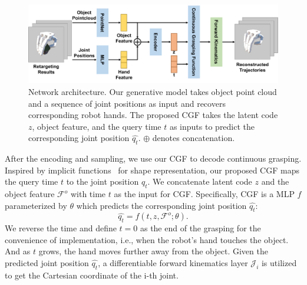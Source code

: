 \documentclass[letterpaper, 10 pt, journal, twoside]{IEEEtran}
\begin{document}
\begin{figure}
\centering
  \vspace{-0.05in}
  \includegraphics[width=0.9\linewidth]{figure/arch.pdf}
  \vspace{-0.15in}
  \caption{\small
  Network architecture. Our generative model takes object point cloud and a sequence of joint positions as input and recovers corresponding robot hands. The proposed CGF takes the latent code $z$, object feature, and the query time $t$ as inputs to predict the corresponding joint position $\hat{q_t}$. $\oplus$ denotes concatenation. }
  \vspace{-0.2in}
  \label{fig:arch}
\end{figure}

After the encoding and sampling, we use our CGF to decode continuous grasping. Inspired by implicit functions~\cite{park2019deepsdf, mescheder2019occupancy, chen2019learning} for shape representation, our proposed CGF maps the query time $t$ to the joint position $q_t$. We concatenate latent code $z$ and the object feature $\mathcal{F}^{o}$ with time $t$ as the input for CGF. Specifically, CGF is a MLP $f$ parameterized by $\theta$ which predicts the corresponding joint position $\hat{q_t}$:
\begin{equation}
    \hat{q_t} = f(t, z, \mathcal{F}^{o}; \theta).
\end{equation}
We reverse the time and define $t=0$ as the end of the grasping for the convenience of implementation, i.e., when the robot's hand touches the object. And as $t$ grows, the hand moves further away from the object.  Given the predicted joint position $\hat{q_t}$, a differentiable forward kinematics layer $\mathcal{J}_i$ is utilized to get the Cartesian coordinate of the i-th joint.
\end{document}
